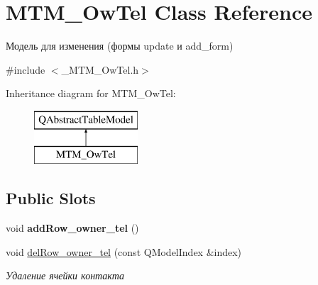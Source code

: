 \hypertarget{class_m_t_m___ow_tel}{}\section{M\+T\+M\+\_\+\+Ow\+Tel Class Reference}
\label{class_m_t_m___ow_tel}


Модель для изменения (формы update и add\+\_\+form)  




{\ttfamily \#include $<$\+\_\+\+M\+T\+M\+\_\+\+Ow\+Tel.\+h$>$}

Inheritance diagram for M\+T\+M\+\_\+\+Ow\+Tel\+:\begin{figure}[H]
\begin{center}
\leavevmode
\includegraphics[height=2.000000cm]{class_m_t_m___ow_tel}
\end{center}
\end{figure}
\subsection*{Public Slots}
\begin{DoxyCompactItemize}
\item 
\mbox{\label{class_m_t_m___ow_tel_a5de57d55e66180884724b24df2b44df5}} 
void {\bfseries add\+Row\+\_\+owner\+\_\+tel} ()
\item 
\mbox{\label{class_m_t_m___ow_tel_a9bc091aeeaa3b36b9cb9067f8793b5b3}} 
void \mbox{\hyperlink{class_m_t_m___ow_tel_a9bc091aeeaa3b36b9cb9067f8793b5b3}{del\+Row\+\_\+owner\+\_\+tel}} (const Q\+Model\+Index \&index)
\begin{DoxyCompactList}\small\item\em Удаление ячейки контакта \end{DoxyCompactList}\end{DoxyCompactItemize}
